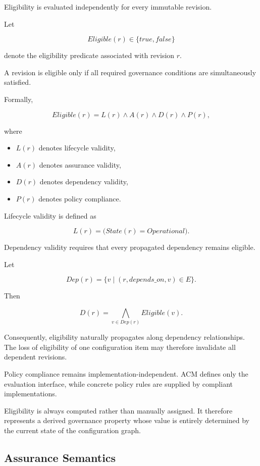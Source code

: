 \documentclass[10pt]{article}
\begin{document}
Eligibility is evaluated independently for every immutable revision.

Let

\[
Eligible(r)\in\{true,false\}
\]

denote the eligibility predicate associated with revision \(r\).

A revision is eligible only if all required governance conditions are simultaneously satisfied.

Formally,

\[
Eligible(r)
=
L(r)
\land
A(r)
\land
D(r)
\land
P(r),
\]

where

\begin{itemize}

\item \(L(r)\) denotes lifecycle validity,

\item \(A(r)\) denotes assurance validity,

\item \(D(r)\) denotes dependency validity,

\item \(P(r)\) denotes policy compliance.

\end{itemize}

Lifecycle validity is defined as

\[
L(r)
=
\big(
State(r)=Operational
\big).
\]

Dependency validity requires that every propagated dependency remains eligible.

Let

\[
Dep(r)
=
\{
v
\mid
(r,depends\_on,v)\in E
\}.
\]

Then

\[
D(r)
=
\bigwedge_{v\in Dep(r)}
Eligible(v).
\]

Consequently, eligibility naturally propagates along dependency relationships. The loss of eligibility of one configuration item may therefore invalidate all dependent revisions.

Policy compliance remains implementation-independent. ACM defines only the evaluation interface, while concrete policy rules are supplied by compliant implementations.

Eligibility is always computed rather than manually assigned. It therefore represents a derived governance property whose value is entirely determined by the current state of the configuration graph.

\subsection{Assurance Semantics}
\label{sec:assurance}
\end{document}

